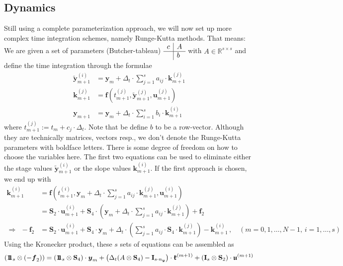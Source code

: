 \documentclass{article}
\newcommand{\defeq}{\mathrel{:=}}%
\newcommand{\kron}{\otimes}%
\newcommand{\setR}{\mathbb{R}}%
\newcommand{\vectorfont}[1]{\boldsymbol{#1}}%
\newcommand{\matrixfont}[1]{\mathbf{#1}}%
\newcommand{\fvec}{\vectorfont{f}}
\newcommand{\kvec}{\vectorfont{k}}
\newcommand{\uvec}{\vectorfont{u}}
\newcommand{\yvec}{\vectorfont{y}}
\newcommand{\tildeyvec}{\vectorfont{\tilde{y}}}
\newcommand{\kfrakvec}{\vectorfont{\mathfrak{k}}}
\newcommand{\ufrakvec}{\vectorfont{\mathfrak{u}}}
\newcommand{\einsvec}{\vectorfont{1}\negthinspace\negthinspace\vectorfont{1}} %
\newcommand{\Imat}{\matrixfont{I}}%
\newcommand{\Smat}{\matrixfont{S}}
\begin{document}
\subsection*{Dynamics}
%
Still using a complete parameterization approach, we will now set up more complex time integration schemes, namely Runge-Kutta methods.
That means: We are given a set of parameters (Butcher-tableau) $\begin{array}{r|l}c & A\\\hline & b\end{array}$ with $A \in \setR^{s \times s}$ and define the time integration through the formulae
\begin{equation}
\begin{split}
\tildeyvec_{m+1}^{(i)} &= \yvec_{m} + \Delta_t \cdot \sum_{j=1}^s a_{ij} \cdot \kvec_{m+1}^{(j)} \\
\kvec_{m+1}^{(j)} &= \fvec \left(t_{m+1}^{(j)}, \tildeyvec_{m+1}^{(j)}, \uvec_{m+1}^{(j)}  \right)\\
\yvec_{m+1} &= \yvec_m + \Delta_t \cdot \sum_{i=1}^s b_i \cdot \kvec_{m+1}^{(i)}
\end{split} 
\label{eq:RK_scheme}
\end{equation}
where $t_{m+1}^{(j)} \defeq t_m + c_j \cdot \Delta_t$.
Note that be define $b$ to be a row-vector.
Although they are technically matrices, vectors resp., we don't denote the Runge-Kutta parameters with boldface letters. 
There is some degree of freedom on how to choose the variables here.
The first two equations can be used to eliminate either the stage values $\tildeyvec_{m+1}^{(i)}$ or the slope values $\kvec_{m+1}^{(i)}$.
If the first approach is chosen, we end up with
\begin{align*}
\kvec_{m+1}^{(i)} &= \fvec \left(t_{m+1}^{(i)}, \yvec_{m} + \Delta_t \cdot \sum_{j=1}^s a_{ij} \cdot \kvec_{m+1}^{(j)}, \uvec_{m+1}^{(i)}\right)
\\
 &= \Smat_2 \cdot \uvec_{m+1}^{(i)} + \Smat_4 \cdot \left(\yvec_m + \Delta_t \cdot \sum_{j=1}^s a_{ij}\cdot \kvec_{m+1}^{(j)}\right) + \fvec_2
\\
\Rightarrow~~
-\fvec_2 &= \Smat_2 \cdot \uvec_{m+1}^{(i)} + \Smat_4 \cdot \yvec_m + \Delta_t \cdot \left(\sum_{j=1}^s a_{ij} \cdot \Smat_4 \cdot \kvec_{m+1}^{(j)}\right) - \kvec_{m+1}^{(i)}\,,\quad
(m=0,1,\ldots, N-1,\,i=1,\ldots,s)
\end{align*}
Using the Kronecker product, these $s$ sets of equations can be assembled as
\[
(\einsvec_s \kron (-\fvec_2)) = (\einsvec_s \kron \Smat_4) \cdot \yvec_m  + \left( \Delta_t (A \kron \Smat_4) - \Imat_{s\cdot n_{\yvec}}\right)\cdot \kfrakvec^{(m+1)} + (\Imat_s \kron \Smat_2) \cdot \ufrakvec^{(m+1)}
\]
\end{document}
